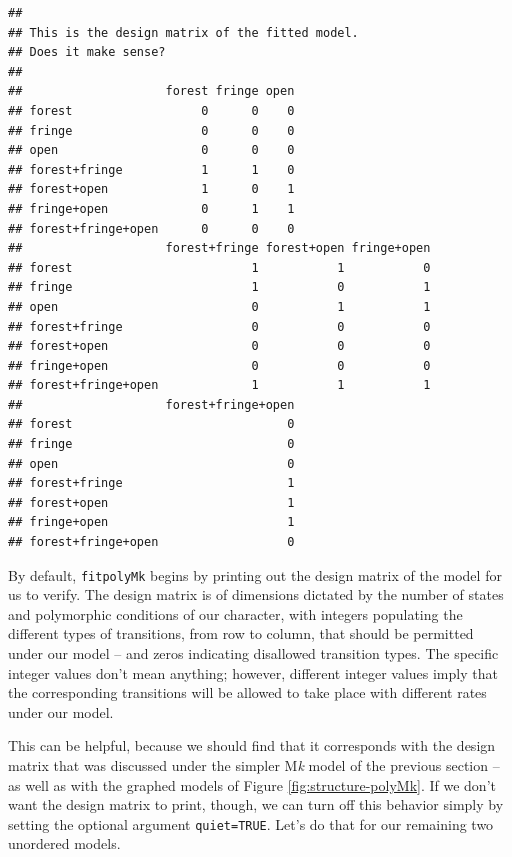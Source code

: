 \documentclass[fleqn,10pt,lineno]{wlpeerj} %
\begin{document}
\begin{verbatim}
## 
## This is the design matrix of the fitted model.
## Does it make sense?
## 
##                    forest fringe open
## forest                  0      0    0
## fringe                  0      0    0
## open                    0      0    0 
## forest+fringe           1      1    0
## forest+open             1      0    1
## fringe+open             0      1    1
## forest+fringe+open      0      0    0
##                    forest+fringe forest+open fringe+open
## forest                         1           1           0
## fringe                         1           0           1
## open                           0           1           1
## forest+fringe                  0           0           0
## forest+open                    0           0           0
## fringe+open                    0           0           0
## forest+fringe+open             1           1           1
##                    forest+fringe+open
## forest                              0
## fringe                              0
## open                                0
## forest+fringe                       1
## forest+open                         1
## fringe+open                         1
## forest+fringe+open                  0
\end{verbatim}

By default, \texttt{fitpolyMk} begins by printing out the design matrix of the model for us to verify. The design matrix is of dimensions dictated by the number of states and polymorphic conditions of our character, with integers populating the different types of transitions, from row to column, that should be permitted under our model -- and zeros indicating disallowed transition types. The specific integer values don't mean anything; however, different integer values imply that the corresponding transitions will be allowed to take place with different rates under our model.

This can be helpful, because we should find that it corresponds with the design matrix that was discussed under the simpler M\emph{k} model of the previous section -- as well as with the graphed models of Figure \ref{fig:structure-polyMk}. If we don't want the design matrix to print, though, we can turn off this behavior simply by setting the optional argument \texttt{quiet=TRUE}. Let's do that for our remaining two unordered models.
\end{document}
